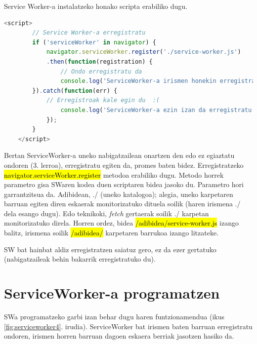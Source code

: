 Service Worker-a instalatzeko honako scripta erabiliko dugu.

\begin{lstlisting}[language=JavaScript]
<script>
		// Service Worker-a erregistratu
		if ('serviceWorker' in navigator) {
			navigator.serviceWorker.register('./service-worker.js')
			.then(function(registration) {
		        // Ondo erregistratu da
		        console.log('ServiceWorker-a irismen honekin erregistratu da: ', registration.scope);
		}).catch(function(err) {
		    // Erregistroak kale egin du  :(
		    	console.log('ServiceWorker-a ezin izan da erregistratu: ', err);
		    });
		}
	</script>
\end{lstlisting}
Bertan ServiceWorker-a uneko nabigatzailean onartzen den edo ez egiaztatu ondoren (3. lerroa), erregistratu egiten da, promes baten bidez. Erregistratzeko \hl{navigator.serviceWorker.register} metodoa erabiliko dugu. Metodo horrek parametro gisa SWaren kodea duen scriptaren bidea jasoko du. Parametro hori garrantzitsua da. Adibidean, \textquotesingle{}./\textquotesingle{} (uneko katalogoa); alegia, uneko karpetaren barruan egiten diren eskaerak monitorizatuko dituela soilik (haren irismena \textquotesingle{}./\textquotesingle{} dela esango dugu). Edo teknikoki, \textit{fetch} gertaerak soilik \textquotesingle{}./\textquotesingle{} karpetan monitorizatuko direla. Horren ordez, bidea  \hl{/adibidea/service-worker.js} izango balitz, irismena soilik \hl{/adibidea/} karpetaren barrukoa izango litzateke.

SW bat hainbat aldiz erregistratzen saiatuz gero, ez da ezer gertatuko (nabigatzaileak behin bakarrik erregistratuko du).  

\section{ServiceWorker-a programatzen}

SWa programatzeko garbi izan behar dugu haren funtzionamendua (ikus \ref{fig:serviceworker4}. irudia). ServiceWorker bat irismen baten barruan erregistratu ondoren, irismen horren barruan dagoen eskaera berriak jasotzen hasiko da.


